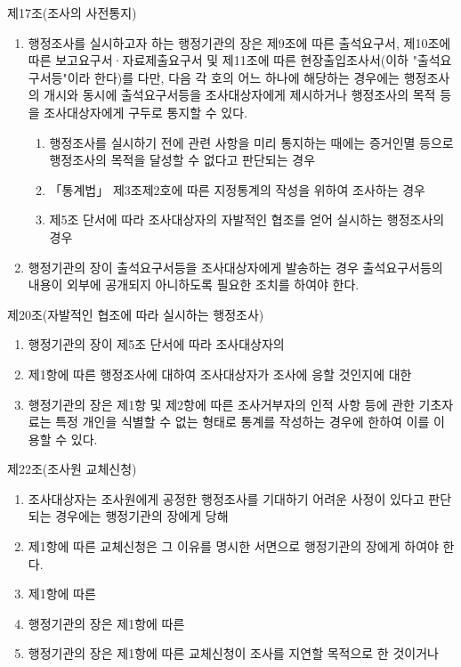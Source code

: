 제17조(조사의 사전통지)
\begin{enumerate}[①]\tightlist
\item 행정조사를 실시하고자 하는 행정기관의 장은 제9조에 따른 출석요구서, 제10조에 따른 보고요구서·자료제출요구서 및 제11조에 따른 현장출입조사서(이하 "출석요구서등"이라 한다)를  다만, 다음 각 호의 어느 하나에 해당하는 경우에는 행정조사의 개시와 동시에 출석요구서등을 조사대상자에게 제시하거나 행정조사의 목적 등을 조사대상자에게 구두로 통지할 수 있다.
	\begin{enumerate}[1.]\tightlist
	\item 행정조사를 실시하기 전에 관련 사항을 미리 통지하는 때에는 증거인멸 등으로 행정조사의 목적을 달성할 수 없다고 판단되는 경우
	\item 「통계법」  제3조제2호에 따른 지정통계의 작성을 위하여 조사하는 경우
	\item 제5조 단서에 따라 조사대상자의 자발적인 협조를 얻어 실시하는 행정조사의 경우
	\end{enumerate}
\item 행정기관의 장이 출석요구서등을 조사대상자에게 발송하는 경우 출석요구서등의 내용이 외부에 공개되지 아니하도록 필요한 조치를 하여야 한다.
\end{enumerate}

제20조(자발적인 협조에 따라 실시하는 행정조사)
\begin{enumerate}[①]\tightlist
\item 행정기관의 장이 제5조 단서에 따라 조사대상자의 
\item 제1항에 따른 행정조사에 대하여 조사대상자가 조사에 응할 것인지에 대한 
\item 행정기관의 장은 제1항 및 제2항에 따른 조사거부자의 인적 사항 등에 관한 기초자료는 특정 개인을 식별할 수 없는 형태로 통계를 작성하는 경우에 한하여 이를 이용할 수 있다.
\end{enumerate}

제22조(조사원 교체신청)
\begin{enumerate}[①]\tightlist
\item 조사대상자는 조사원에게 공정한 행정조사를 기대하기 어려운 사정이 있다고 판단되는 경우에는 행정기관의 장에게 당해 
\item 제1항에 따른 교체신청은 그 이유를 명시한 서면으로 행정기관의 장에게 하여야 한다.
\item 제1항에 따른 
\item 행정기관의 장은 제1항에 따른 
\item 행정기관의 장은 제1항에 따른 교체신청이 조사를 지연할 목적으로 한 것이거나 
\end{enumerate}

